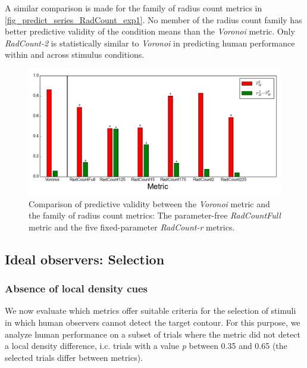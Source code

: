 \documentclass[12pt]{article}
\begin{document}
A similar comparison is made for the family of radius count metrics in \autoref{fig_predict_series_RadCount_exp1}. No member of the radius count family has better predictive validity of the condition means than the \emph{Voronoi} metric. Only \emph{RadCount-2} is statistically similar to \emph{Voronoi} in predicting human performance within and across stimulus conditions.

\begin{figure}
\includegraphics{Figures/FIG_SUP_predict_series_RadCount_exp1.png}
\caption{Comparison of predictive validity between the \emph{Voronoi} metric and the family of radius count metrics: The parameter-free \emph{RadCountFull} metric and the five fixed-parameter \emph{RadCount-r} metrics.}
\label{fig_predict_series_RadCount_exp1}
\end{figure}



\subsection{Ideal observers: Selection}

\subsubsection{Absence of local density cues}

We now evaluate which metrics offer suitable criteria for the selection of stimuli in which human observers cannot detect the target contour. For this purpose, we analyze human performance on a subset of trials where the metric did not detect a local density difference, i.c. trials with a value \emph{p} between 0.35 and 0.65 (the selected trials differ between metrics).
\end{document}
